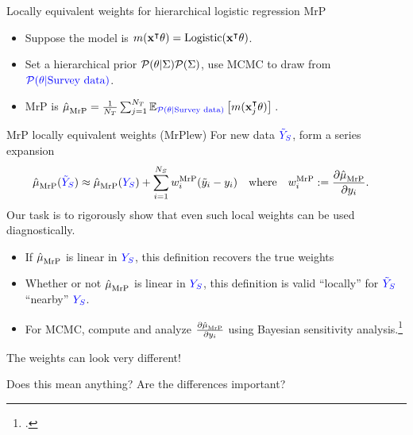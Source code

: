 \begin{frame}[t]{Locally equivalent weights for hierarchical logistic regression MrP}

\def\Y{\surcol{Y_S}}
\def\Ytil{\surcol{\tilde{Y}_S}}
%
\begin{itemize}
    \item Suppose the model is $m(\mathbf{x}^\intercal \theta) = \mathrm{Logistic}(\mathbf{x}^\intercal \theta)$.
    \item Set a hierarchical prior $\mathcal{P}(\theta \vert \Sigma)\mathcal{P}(\Sigma)$,
            use MCMC to draw from $\textcolor{blue}{\mathcal{P}(\theta \vert \textrm{Survey data})}$.
    \item MrP is $\hat{\mu}^{}_{\mathrm{MrP}} = \frac{1}{{N_T}} \sum_{j=1}^{N_T} \mathbb{E}_{\textcolor{blue}{\mathcal{P}(\theta \vert \textrm{Survey data})}}\left[ m(\mathbf{x}_j^\intercal \theta)\right]\,$.
\end{itemize}
\pause
\begin{block}{MrP locally equivalent weights (MrPlew)}
\centering
\vspace{1em}
For new data $\Ytil$, form a series expansion
$$
\begin{aligned}
\muhat_\mrp(\Ytil) \approx{}& \muhat_\mrp(\Y) + \sumsur \w_i^\mrp (\ytil_i - \y_i)\quad
\textrm{where}\quad \w_i^\mrp :={} \frac{\partial \muhat_\mrp}{\partial \y_i}.
\end{aligned}
$$
Our task is to rigorously show that even such local weights can be used
diagnostically.
\vspace{1em}
\end{block}
%
\pause
\begin{itemize}
\item If $\hat{\mu}^{}_{\mathrm{MrP}}$ is linear in $\Y$, this definition recovers the true weights
\item Whether or not $\hat{\mu}^{}_{\mathrm{MrP}}$ is linear in $\Y$, this definition is valid
    ``locally'' for $\Ytil$ ``nearby'' $\Y$.
\item For MCMC, compute and analyze $\frac{\partial \hat{\mu}^{}_{\mathrm{MrP}}}{\partial y_i}$
using Bayesian sensitivity analysis.\footcite{gustafson:1996:localposterior,giordano:2018:covariances}
\end{itemize}
%


\end{frame}




\begin{frame}{The weights can look very different!}

    \centering
    Does this mean anything?  Are the differences important?

    \WeightPlot{}
\end{frame}


